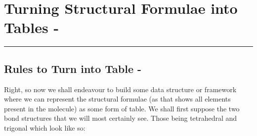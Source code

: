 \documentclass[a4paper,10pt]{article}
\begin{document}
\begin{table}[h!]
\captionsetup{justification=centering}
\noindent{}
\caption{\small{The 20 Natural Amino Acids with Their 3 \& 1 Letter Codes}}
\label{tab:tnaa}
\end{table}




\section{Turning Structural Formulae into Tables -}
\rule{\textwidth}{1pt}
\subsection{Rules to Turn into Table -}
Right, so now we shall endeavour to build some data structure or framework where we can represent the structural formulae (as that shows all elements present in the molecule) as some form of table. We shall first suppose the two bond structures that we will most certainly see. Those being tetrahedral and trigonal which look like so:
\end{document}
